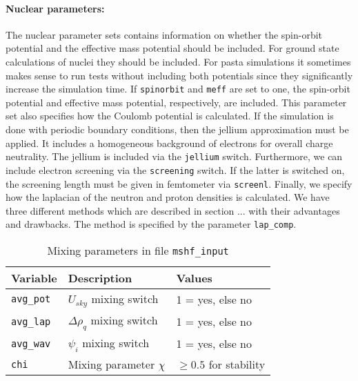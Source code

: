 \documentclass[3p]{elsarticle}
\begin{document}
\paragraph{Nuclear parameters:} The nuclear parameter sets contains information on whether the spin-orbit potential and the effective mass potential should be included. For ground state calculations of nuclei they should be included. For pasta simulations it sometimes makes sense to run tests without including both potentials since they significantly increase the simulation time. If {\tt spinorbit} and {\tt meff} are set to one, the spin-orbit potential and effective mass potential, respectively, are included. This parameter set also specifies how the Coulomb potential is calculated. If the simulation is done with periodic boundary conditions, then the jellium approximation must be applied. It includes a homogeneous background of electrons for overall charge neutrality. The jellium is included via the {\tt jellium} switch. Furthermore, we can include electron screening via the {\tt screening} switch. If the latter is switched on, the screening length must be given in femtometer via {\tt screenl}. Finally, we specify how the laplacian of the neutron and proton densities is calculated. We have three different methods which are described in section ... with their advantages and drawbacks. The method is specified by the parameter {\tt lap\_comp}.
\begin{table}
\caption{Mixing parameters in file \texttt{mshf\_input}}
\begin{tabular*}{\columnwidth}{ l l l}
\hline
\hline
Variable & Description & Values\\
\hline
{\tt avg\_pot}                & $U_{sky}$ mixing switch                   & 1 = yes, else no\\
\texttt{avg\_lap}           & $\Delta \rho_q$ mixing switch           & 1 = yes, else no\\
\texttt{avg\_wav}         & $\psi_i$ mixing switch                       & 1 = yes, else no\\
\texttt{chi}                    & Mixing parameter $\chi$                   & $\geq 0.5$ for stability \\ 
\hline
\hline
\end{tabular*}
\label{table3}
\end{table}
\end{document}
